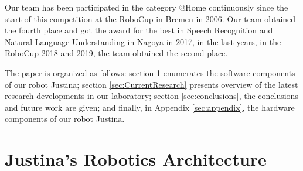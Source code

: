 \documentclass{llncs}
\begin{document}
Our team has been participated in the category @Home continuously since the start of this competition at the RoboCup in Bremen in 2006. Our team obtained the  fourth place and got the award for the best in Speech Recognition and Natural Language Understanding in Nagoya in 2017, in the last years, in the RoboCup 2018 and 2019, the team obtained the second place.

The paper is organized as follows:
section \ref{sec:background} enumerates the software components of our robot
Justina; section \ref{sec:CurrentResearch}  presents overview of the latest research developments in our
laboratory; section \ref{sec:conclusions}, the conclusions and future work are given;
and finally, in Appendix \ref{sec:appendix}, the hardware components of our robot Justina.


\section{Justina's Robotics Architecture}\label{sec:background}






\end{document}
